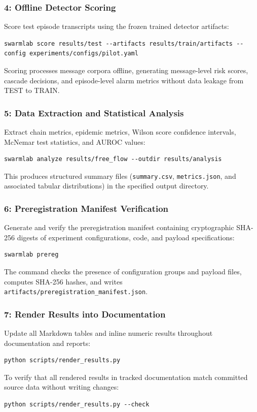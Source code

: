 \documentclass[11pt,a4paper]{article}
\begin{document}
\subsubsection{4: Offline Detector Scoring}
Score test episode transcripts using the frozen trained detector artifacts:
\begin{verbatim}
swarmlab score results/test --artifacts results/train/artifacts --config experiments/configs/pilot.yaml
\end{verbatim}
Scoring processes message corpora offline, generating message-level risk scores, cascade decisions, and episode-level alarm metrics without data leakage from TEST to TRAIN.

\subsubsection{5: Data Extraction and Statistical Analysis}
Extract chain metrics, epidemic metrics, Wilson score confidence intervals, McNemar test statistics, and AUROC values:
\begin{verbatim}
swarmlab analyze results/free_flow --outdir results/analysis
\end{verbatim}
This produces structured summary files (\texttt{summary.csv}, \texttt{metrics.json}, and associated tabular distributions) in the specified output directory.

\subsubsection{6: Preregistration Manifest Verification}
Generate and verify the preregistration manifest containing cryptographic SHA-256 digests of experiment configurations, code, and payload specifications:
\begin{verbatim}
swarmlab prereg
\end{verbatim}
The command checks the presence of configuration groups and payload files, computes SHA-256 hashes, and writes \texttt{artifacts/preregistration\_manifest.json}.

\subsubsection{7: Render Results into Documentation}
Update all Markdown tables and inline numeric results throughout documentation and reports:
\begin{verbatim}
python scripts/render_results.py
\end{verbatim}
To verify that all rendered results in tracked documentation match committed source data without writing changes:
\begin{verbatim}
python scripts/render_results.py --check
\end{verbatim}
\end{document}

